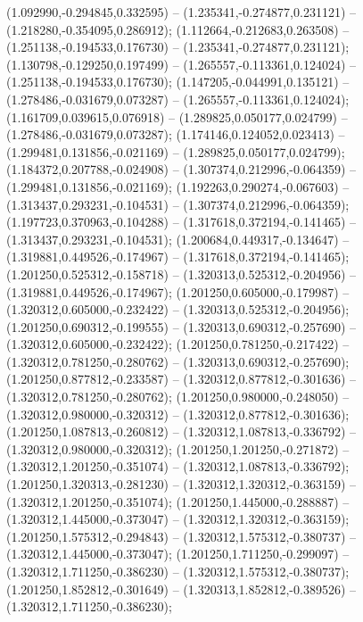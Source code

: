  (1.092990,-0.294845,0.332595) -- (1.235341,-0.274877,0.231121) -- (1.218280,-0.354095,0.286912);
 (1.112664,-0.212683,0.263508) -- (1.251138,-0.194533,0.176730) -- (1.235341,-0.274877,0.231121);
 (1.130798,-0.129250,0.197499) -- (1.265557,-0.113361,0.124024) -- (1.251138,-0.194533,0.176730);
 (1.147205,-0.044991,0.135121) -- (1.278486,-0.031679,0.073287) -- (1.265557,-0.113361,0.124024);
 (1.161709,0.039615,0.076918) -- (1.289825,0.050177,0.024799) -- (1.278486,-0.031679,0.073287);
 (1.174146,0.124052,0.023413) -- (1.299481,0.131856,-0.021169) -- (1.289825,0.050177,0.024799);
 (1.184372,0.207788,-0.024908) -- (1.307374,0.212996,-0.064359) -- (1.299481,0.131856,-0.021169);
 (1.192263,0.290274,-0.067603) -- (1.313437,0.293231,-0.104531) -- (1.307374,0.212996,-0.064359);
 (1.197723,0.370963,-0.104288) -- (1.317618,0.372194,-0.141465) -- (1.313437,0.293231,-0.104531);
 (1.200684,0.449317,-0.134647) -- (1.319881,0.449526,-0.174967) -- (1.317618,0.372194,-0.141465);
 (1.201250,0.525312,-0.158718) -- (1.320313,0.525312,-0.204956) -- (1.319881,0.449526,-0.174967);
 (1.201250,0.605000,-0.179987) -- (1.320312,0.605000,-0.232422) -- (1.320313,0.525312,-0.204956);
 (1.201250,0.690312,-0.199555) -- (1.320313,0.690312,-0.257690) -- (1.320312,0.605000,-0.232422);
 (1.201250,0.781250,-0.217422) -- (1.320312,0.781250,-0.280762) -- (1.320313,0.690312,-0.257690);
 (1.201250,0.877812,-0.233587) -- (1.320312,0.877812,-0.301636) -- (1.320312,0.781250,-0.280762);
 (1.201250,0.980000,-0.248050) -- (1.320312,0.980000,-0.320312) -- (1.320312,0.877812,-0.301636);
 (1.201250,1.087813,-0.260812) -- (1.320312,1.087813,-0.336792) -- (1.320312,0.980000,-0.320312);
 (1.201250,1.201250,-0.271872) -- (1.320312,1.201250,-0.351074) -- (1.320312,1.087813,-0.336792);
 (1.201250,1.320313,-0.281230) -- (1.320312,1.320312,-0.363159) -- (1.320312,1.201250,-0.351074);
 (1.201250,1.445000,-0.288887) -- (1.320312,1.445000,-0.373047) -- (1.320312,1.320312,-0.363159);
 (1.201250,1.575312,-0.294843) -- (1.320312,1.575312,-0.380737) -- (1.320312,1.445000,-0.373047);
 (1.201250,1.711250,-0.299097) -- (1.320312,1.711250,-0.386230) -- (1.320312,1.575312,-0.380737);
 (1.201250,1.852812,-0.301649) -- (1.320313,1.852812,-0.389526) -- (1.320312,1.711250,-0.386230);
